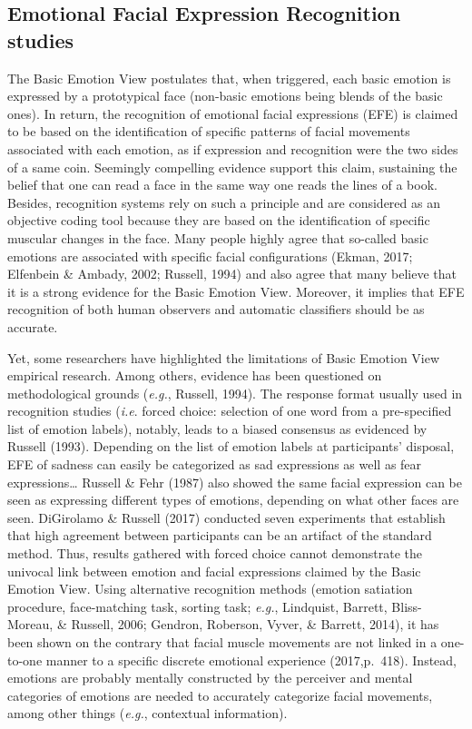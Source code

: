 \documentclass[man]{apa6}
\begin{document}
\hypertarget{emotional-facial-expression-recognition-studies}{%
\subsection{Emotional Facial Expression Recognition studies}\label{emotional-facial-expression-recognition-studies}}

The Basic Emotion View postulates that, when triggered, each basic emotion is expressed by a prototypical face (non-basic emotions being blends of the basic ones). In return, the recognition of emotional facial expressions (EFE) is claimed to be based on the identification of specific patterns of facial movements associated with each emotion, as if expression and recognition were the two sides of a same coin. Seemingly compelling evidence support this claim, sustaining the belief that one can read a face in the same way one reads the lines of a book. Besides, recognition systems rely on such a principle and are considered as an objective coding tool because they are based on the identification of specific muscular changes in the face. Many people highly agree that so-called basic emotions are associated with specific facial configurations (Ekman, 2017; Elfenbein \& Ambady, 2002; Russell, 1994) and also agree that many believe that it is a strong evidence for the Basic Emotion View. Moreover, it implies that EFE recognition of both human observers and automatic classifiers should be as accurate.

Yet, some researchers have highlighted the limitations of Basic Emotion View empirical research. Among others, evidence has been questioned on methodological grounds (\emph{e.g.}, Russell, 1994). The response format usually used in recognition studies (\emph{i.e}. forced choice: selection of one word from a pre-specified list of emotion labels), notably, leads to a biased consensus as evidenced by Russell (1993). Depending on the list of emotion labels at participants' disposal, EFE of sadness can easily be categorized as sad expressions as well as fear expressions\ldots{} Russell \& Fehr (1987) also showed the same facial expression can be seen as expressing different types of emotions, depending on what other faces are seen. DiGirolamo \& Russell (2017) conducted seven experiments that establish that high agreement between participants can be an artifact of the standard method. Thus, results gathered with forced choice cannot demonstrate the univocal link between emotion and facial expressions claimed by the Basic Emotion View. Using alternative recognition methods (emotion satiation procedure, face-matching task, sorting task; \emph{e.g.}, Lindquist, Barrett, Bliss-Moreau, \& Russell, 2006; Gendron, Roberson, Vyver, \& Barrett, 2014), it has been shown on the contrary that facial muscle movements are not linked in a one-to-one manner to a specific discrete emotional experience (2017,p.~418). Instead, emotions are probably mentally constructed by the perceiver and mental categories of emotions are needed to accurately categorize facial movements, among other things (\emph{e.g.}, contextual information).
\end{document}
